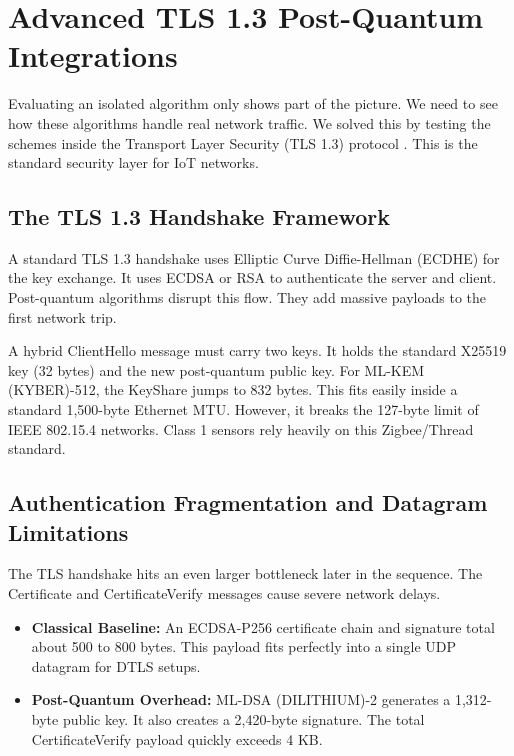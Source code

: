 \section{Advanced TLS 1.3 Post-Quantum Integrations}
\label{sec:tls_handshake}

Evaluating an isolated algorithm only shows part of the picture. We need to see how these algorithms handle real network traffic. We solved this by testing the schemes inside the Transport Layer Security (TLS 1.3) protocol \cite{campagna2020tls}. This is the standard security layer for IoT networks.

\subsection{The TLS 1.3 Handshake Framework}
A standard TLS 1.3 handshake uses Elliptic Curve Diffie-Hellman (ECDHE) for the key exchange. It uses ECDSA or RSA to authenticate the server and client. Post-quantum algorithms disrupt this flow. They add massive payloads to the first network trip.

A hybrid ClientHello message must carry two keys. It holds the standard X25519 key (32 bytes) and the new post-quantum public key. For ML-KEM (KYBER)-512, the KeyShare jumps to 832 bytes. This fits easily inside a standard 1,500-byte Ethernet MTU. However, it breaks the 127-byte limit of IEEE 802.15.4 networks. Class 1 sensors rely heavily on this Zigbee/Thread standard.

\subsection{Authentication Fragmentation and Datagram Limitations}
The TLS handshake hits an even larger bottleneck later in the sequence. The Certificate and CertificateVerify messages cause severe network delays.

\begin{itemize}
 \item \textbf{Classical Baseline:} An ECDSA-P256 certificate chain and signature total about 500 to 800 bytes. This payload fits perfectly into a single UDP datagram for DTLS setups.
 \item \textbf{Post-Quantum Overhead:} ML-DSA (DILITHIUM)-2 generates a 1,312-byte public key. It also creates a 2,420-byte signature. The total CertificateVerify payload quickly exceeds 4 KB.
\end{itemize}

